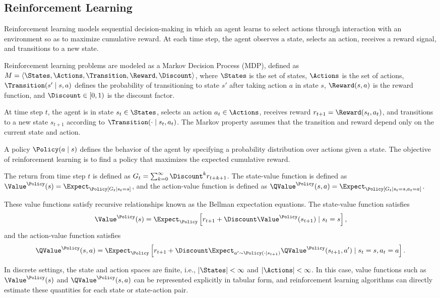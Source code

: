 \subsection{Reinforcement Learning}
\label{sec:rl}

Reinforcement learning models sequential decision-making in which an agent learns to select actions through interaction with an environment so as to maximize cumulative reward. At each time step, the agent observes a state, selects an action, receives a reward signal, and transitions to a new state.

Reinforcement learning problems are modeled as a Markov Decision Process (MDP), defined as $M = \langle \States, \Actions, \Transition, \Reward, \Discount \rangle$, where $\States$ is the set of states, $\Actions$ is the set of actions, $\Transition(s' \mid s,a)$ defines the probability of transitioning to state $s'$ after taking action $a$ in state $s$, $\Reward(s,a)$ is the reward function, and $\Discount \in [0,1)$ is the discount factor.

At time step $t$, the agent is in state $s_t \in \States$, selects an action $a_t \in \Actions$, receives reward $r_{t+1} = \Reward(s_t,a_t)$, and transitions to a new state $s_{t+1}$ according to $\Transition(\cdot \mid s_t,a_t)$. The Markov property assumes that the transition and reward depend only on the current state and action.

A policy $\Policy(a \mid s)$ defines the behavior of the agent by specifying a probability distribution over actions given a state. The objective of reinforcement learning is to find a policy that maximizes the expected cumulative reward.

The return from time step $t$ is defined as $G_t = \sum_{k=0}^{\infty} \Discount^k r_{t+k+1}$. The state-value function is defined as $\Value^\Policy(s) = \Expect_\Policy [G_t \mid s_t = s]$, and the action-value function is defined as $\QValue^\Policy(s,a) = \Expect_\Policy [G_t \mid s_t = s, a_t = a]$.

These value functions satisfy recursive relationships known as the Bellman expectation equations. The state-value function satisfies
\[
\Value^\Policy(s) = \Expect_\Policy \left[ r_{t+1} + \Discount \Value^\Policy(s_{t+1}) \mid s_t = s \right],
\]
and the action-value function satisfies
\[
\QValue^\Policy(s,a) = \Expect_\Policy \left[ r_{t+1} + \Discount \Expect_{a' \sim \Policy(\cdot \mid s_{t+1})} \QValue^\Policy(s_{t+1}, a') \mid s_t = s, a_t = a \right].
\]

In discrete settings, the state and action spaces are finite, i.e., $|\States| < \infty$ and $|\Actions| < \infty$. In this case, value functions such as $\Value^\Policy(s)$ and $\QValue^\Policy(s,a)$ can be represented explicitly in tabular form, and reinforcement learning algorithms can directly estimate these quantities for each state or state-action pair.

